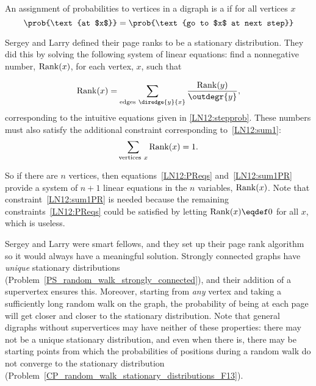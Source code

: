 \begin{definition} An assignment of probabilities to vertices in a digraph
  is a  if for all vertices $x$
\[
\prob{\text{at $x$}} = \prob{\text{go to $x$ at next step}}
\]
\end{definition}  

Sergey and Larry defined their page ranks to be a stationary distribution.
They did this by solving the following system of linear equations: find a
nonnegative number, $\operatorname{Rank}(x)$, for each vertex, $x$, such that

\begin{equation}\label{LN12:PReqs}
\PRnk(x) = \sum_{\text{edges}\ \diredge{y}{x}} \frac{\PRnk(y)}{\outdegr{y}},
\end{equation}
corresponding to the intuitive equations given in \eqref{LN12:stepprob}.
These numbers must also satisfy the additional constraint corresponding
to~\eqref{LN12:sum1}:
\begin{equation}\label{LN12:sum1PR}
\sum_{\text{vertices}\ x} \operatorname{Rank}(x) = 1.
\end{equation}

So if there are $n$ vertices, then equations~\eqref{LN12:PReqs}
and~\eqref{LN12:sum1PR} provide a system of $n+1$ linear equations in the
$n$ variables, $\operatorname{Rank}(x)$.  Note that constraint~\eqref{LN12:sum1PR}
is needed because the remaining constraints~\eqref{LN12:PReqs} could be
satisfied by letting $\PRnk(x)\eqdef 0$ for all $x$, which is useless.

Sergey and Larry were smart fellows, and they set up their page rank
algorithm so it would always have a meaningful solution.  Strongly
connected graphs have \emph{unique} stationary distributions
(Problem~\ref{PS_random_walk_strongly_connected}), and their addition
of a supervertex ensures this.  Moreover, starting from \emph{any}
vertex and taking a sufficiently long random walk on the graph, the
probability of being at each page will get closer and closer to the
stationary distribution.  Note that general digraphs without
supervertices may have neither of these properties: there may not be a
unique stationary distribution, and even when there is, there may be
starting points from which the probabilities of positions during a
random walk do not converge to the stationary distribution
(Problem~\ref{CP_random_walk_stationary_distributions_F13}).


